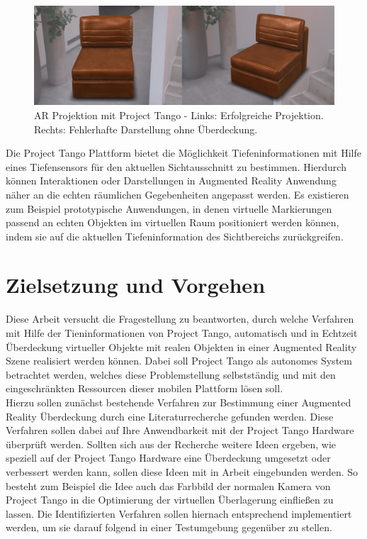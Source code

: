 \begin{figure}[h]
  \centering
	\includegraphics[width=1.0\textwidth]{content/images/occlusion-problem.png} 

  \caption{AR Projektion mit Project Tango - Links: Erfolgreiche Projektion. Rechts: Fehlerhafte Darstellung ohne Überdeckung.}
  \label{fig:occlusion-problem}
\end{figure}

Die Project Tango Plattform bietet die Möglichkeit Tiefeninformationen mit Hilfe eines Tiefensensors für den aktuellen Sichtausschnitt zu bestimmen. Hierdurch können Interaktionen oder Darstellungen in Augmented Reality Anwendung näher an die echten räumlichen Gegebenheiten angepasst werden. Es existieren zum Beispiel prototypische Anwendungen, in denen virtuelle Markierungen passend an echten Objekten im virtuellen Raum positioniert werden können, indem sie auf die aktuellen Tiefeninformation des Sichtbereichs zurückgreifen.\\

\newpage

\section{Zielsetzung und Vorgehen}

Diese Arbeit versucht die Fragestellung zu beantworten, durch welche Verfahren mit Hilfe der Tieninformationen von Project Tango, automatisch und in Echtzeit Überdeckung virtueller Objekte mit realen Objekten in einer Augmented Reality Szene realisiert werden können. Dabei soll Project Tango als autonomes System betrachtet werden, welches diese Problemstellung selbstständig und mit den eingeschränkten Ressourcen dieser mobilen Plattform lösen soll.\\

Hierzu sollen zunächst bestehende Verfahren zur Bestimmung einer Augmented Reality Überdeckung durch eine Literaturrecherche gefunden werden. Diese Verfahren sollen dabei auf Ihre Anwendbarkeit mit der Project Tango Hardware überprüft werden. Sollten sich aus der Recherche weitere Ideen ergeben, wie speziell auf der Project Tango Hardware eine Überdeckung umgesetzt oder verbessert werden kann, sollen diese Ideen mit in Arbeit eingebunden werden. So besteht zum Beispiel die Idee auch das Farbbild der normalen Kamera von Project Tango in die Optimierung der virtuellen Überlagerung einfließen zu lassen. Die Identifizierten Verfahren sollen hiernach entsprechend implementiert werden, um sie darauf folgend in einer Testumgebung gegenüber zu stellen.\\

